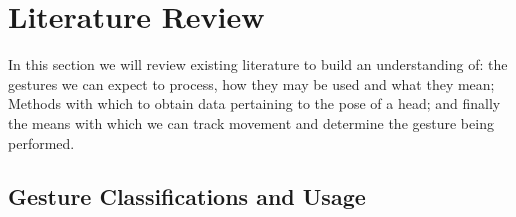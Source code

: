 \section{Literature Review} %
In this section we will review existing literature to build an understanding of: the gestures we can expect to process, how they may be used and what they mean; Methods with which to obtain data pertaining to the pose of a head; and finally the means with which we can track movement and determine the gesture being performed.




\subsection{Gesture Classifications and Usage} %

